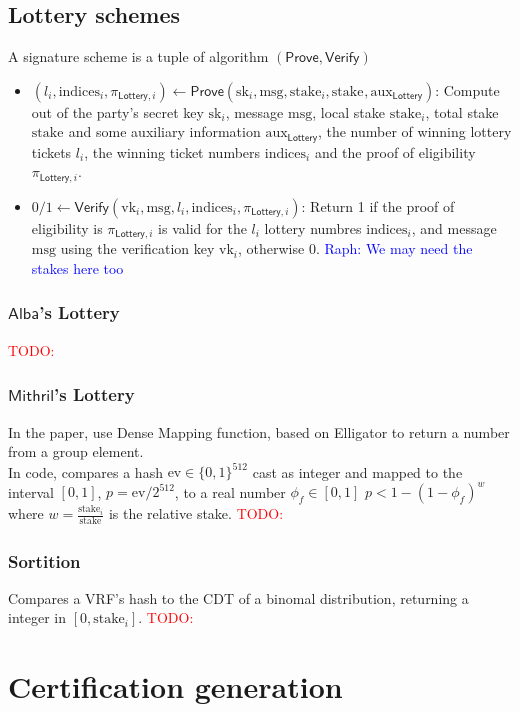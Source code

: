 \documentclass{article}
\newcommand{\vk}[1]{\ensuremath{\textrm{vk}_{#1}}\xspace}
\newcommand{\sk}[1]{\ensuremath{\textrm{sk}_{#1}}\xspace}
\newcommand{\m}{\ensuremath{\textrm{msg}}\xspace}
\newcommand{\aux}{\ensuremath{\textrm{aux}}\xspace}
\newcommand{\stake}[1]{\ensuremath{\textrm{stake}_{#1}}\xspace}
\newcommand{\indices}[1]{\ensuremath{\textrm{indices}_{#1}}\xspace}
\newcommand{\Mithril}{\ensuremath{\mathsf{Mithril}}\xspace}
\newcommand{\Alba}{\ensuremath{\mathsf{Alba}}\xspace}
\newcommand{\Lottery}{\ensuremath{\mathsf{Lottery}}\xspace}
\newcommand{\Verify}{\ensuremath{\mathsf{Verify}}\xspace}
\newcommand{\Prove}{\ensuremath{\mathsf{Prove}}\xspace}
\newcommand{\raph}[1]{\textcolor{blue}{Raph: #1}\xspace}
\newcommand{\todo}[1]{\textcolor{red}{TODO: #1}\xspace}
\begin{document}
\subsection{Lottery schemes}
A signature scheme is a tuple of algorithm $(\Prove, \Verify)$
\begin{itemize}
    \item $(l_i, \indices{i}, \pi_{\Lottery, i}) \leftarrow \Prove(\sk{i}, \m, \stake{i}, \stake{}, \aux_\Lottery)$: Compute out of the party's secret key \sk{i}, message \m, local stake \stake{i}, total stake \stake{} and some auxiliary information $\aux_\Lottery$, the number of winning lottery tickets $l_i$, the winning ticket numbers $\indices{i}$ and the proof of eligibility $\pi_{\Lottery, i}$.
    \item $0/1 \leftarrow \Verify(\vk{i}, \m, l_i, \indices{i}, \pi_{\Lottery, i})$: Return 1 if the proof of eligibility is $\pi_{\Lottery, i}$ is valid for the $l_i$ lottery numbres $\indices{i}$, and message \m using the verification key $\vk{i}$, otherwise 0. \raph{We may need the stakes here too}
\end{itemize}

%
\subsubsection{\Alba's Lottery}
\todo{}

%
\subsubsection{\Mithril's Lottery}
In the paper, use Dense Mapping function, based on Elligator to return a number from a group element.\\

In code, compares a hash $\text{ev} \in \{0,1\}^{512}$ cast as integer and mapped to the interval $[0,1]$, $p = \text{ev} / 2^{512}$, to a real number $\phi_f \in [0, 1]$ $p < 1 - (1 - \phi_f)^{w}$ where $w = \frac{\stake{i}}{\stake{}}$ is the relative stake.
\todo{}

%
\subsubsection{Sortition}
Compares a VRF's hash to the CDT of a binomal distribution, returning a integer in $[0, \stake{i}]$.
\todo{}

%
%
%
\section{Certification generation}
\end{document}
